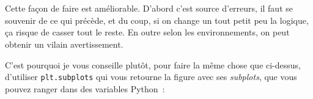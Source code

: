     \begin{center}
    \end{center}
    { \hspace*{\fill} \\}
    
    \begin{center}
    \end{center}
    { \hspace*{\fill} \\}
    
    Cette façon de faire est améliorable. D'abord c'est source d'erreurs, il
faut se souvenir de ce qui précède, et du coup, si on change un tout
petit peu la logique, ça risque de casser tout le reste. En outre selon
les environnements, on peut obtenir un vilain avertissement.

C'est pourquoi je vous conseille plutôt, pour faire la même chose que
ci-dessus, d'utiliser \texttt{plt.subplots} qui vous retourne la figure
avec ses \emph{subplots}, que vous pouvez ranger dans des variables
Python~:

